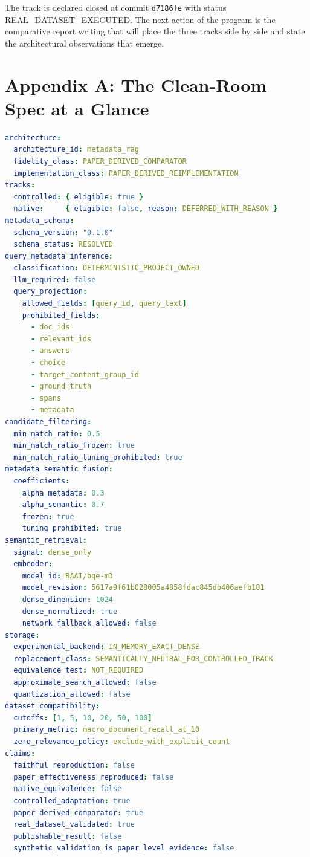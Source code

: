 \documentclass[11pt,a4paper]{article}
\begin{document}
The track is declared closed at commit \texttt{d7186fe} with status
\textsc{REAL\_DATASET\_EXECUTED}. The next action of the program is
the comparative report writing that will place the three tracks
side by side and state the architectural observations that emerge.

\appendix

\section{Appendix A: The Clean-Room Spec at a Glance}
\begin{lstlisting}[language=yaml]
architecture:
  architecture_id: metadata_rag
  fidelity_class: PAPER_DERIVED_COMPARATOR
  implementation_class: PAPER_DERIVED_REIMPLEMENTATION
tracks:
  controlled: { eligible: true }
  native:     { eligible: false, reason: DEFERRED_WITH_REASON }
metadata_schema:
  schema_version: "0.1.0"
  schema_status: RESOLVED
query_metadata_inference:
  classification: DETERMINISTIC_PROJECT_OWNED
  llm_required: false
  query_projection:
    allowed_fields: [query_id, query_text]
    prohibited_fields:
      - doc_ids
      - relevant_ids
      - answers
      - choice
      - target_content_group_id
      - ground_truth
      - spans
      - metadata
candidate_filtering:
  min_match_ratio: 0.5
  min_match_ratio_frozen: true
  min_match_ratio_tuning_prohibited: true
metadata_semantic_fusion:
  coefficients:
    alpha_metadata: 0.3
    alpha_semantic: 0.7
    frozen: true
    tuning_prohibited: true
semantic_retrieval:
  signal: dense_only
  embedder:
    model_id: BAAI/bge-m3
    model_revision: 5617a9f61b028005a4858fdac845db406aefb181
    dense_dimension: 1024
    dense_normalized: true
    network_fallback_allowed: false
storage:
  experimental_backend: IN_MEMORY_EXACT_DENSE
  replacement_class: SEMANTICALLY_NEUTRAL_FOR_CONTROLLED_TRACK
  equivalence_test: NOT_REQUIRED
  approximate_search_allowed: false
  quantization_allowed: false
dataset_compatibility:
  cutoffs: [1, 5, 10, 20, 50, 100]
  primary_metric: macro_document_recall_at_10
  zero_relevance_policy: exclude_with_explicit_count
claims:
  faithful_reproduction: false
  paper_effectiveness_reproduced: false
  native_equivalence: false
  controlled_adaptation: true
  paper_derived_comparator: true
  real_dataset_validated: true
  publishable_result: false
  synthetic_validation_is_paper_level_evidence: false
\end{lstlisting}
\end{document}
